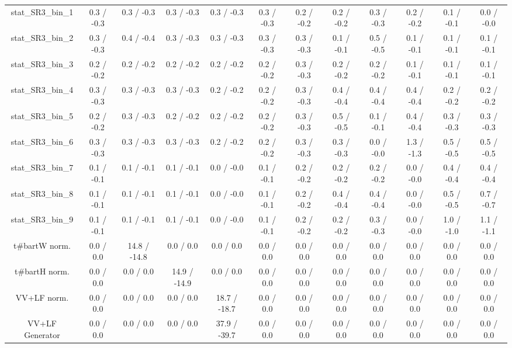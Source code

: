 \begin{table}[htbp]
\begin{center}
\begin{tabular}{|c|c|c|c|c|c|c|c|c|c|c|c|}
 stat_SR3_bin_1 & 0.3 / -0.3 & 0.3 / -0.3 & 0.3 / -0.3 & 0.3 / -0.3 & 0.3 / -0.3 & 0.2 / -0.2 & 0.2 / -0.2 & 0.3 / -0.3 & 0.2 / -0.2 & 0.1 / -0.1 & 0.0 / -0.0 \\ 
 stat_SR3_bin_2 & 0.3 / -0.3 & 0.4 / -0.4 & 0.3 / -0.3 & 0.3 / -0.3 & 0.3 / -0.3 & 0.3 / -0.3 & 0.1 / -0.1 & 0.5 / -0.5 & 0.1 / -0.1 & 0.1 / -0.1 & 0.1 / -0.1 \\ 
 stat_SR3_bin_3 & 0.2 / -0.2 & 0.2 / -0.2 & 0.2 / -0.2 & 0.2 / -0.2 & 0.2 / -0.2 & 0.3 / -0.3 & 0.2 / -0.2 & 0.2 / -0.2 & 0.1 / -0.1 & 0.1 / -0.1 & 0.1 / -0.1 \\ 
 stat_SR3_bin_4 & 0.3 / -0.3 & 0.3 / -0.3 & 0.3 / -0.3 & 0.2 / -0.2 & 0.2 / -0.2 & 0.3 / -0.3 & 0.4 / -0.4 & 0.4 / -0.4 & 0.4 / -0.4 & 0.2 / -0.2 & 0.2 / -0.2 \\ 
 stat_SR3_bin_5 & 0.2 / -0.2 & 0.3 / -0.3 & 0.2 / -0.2 & 0.2 / -0.2 & 0.2 / -0.2 & 0.3 / -0.3 & 0.5 / -0.5 & 0.1 / -0.1 & 0.4 / -0.4 & 0.3 / -0.3 & 0.3 / -0.3 \\ 
 stat_SR3_bin_6 & 0.3 / -0.3 & 0.3 / -0.3 & 0.3 / -0.3 & 0.2 / -0.2 & 0.2 / -0.2 & 0.3 / -0.3 & 0.3 / -0.3 & 0.0 / -0.0 & 1.3 / -1.3 & 0.5 / -0.5 & 0.5 / -0.5 \\ 
 stat_SR3_bin_7 & 0.1 / -0.1 & 0.1 / -0.1 & 0.1 / -0.1 & 0.0 / -0.0 & 0.1 / -0.1 & 0.2 / -0.2 & 0.2 / -0.2 & 0.2 / -0.2 & 0.0 / -0.0 & 0.4 / -0.4 & 0.4 / -0.4 \\ 
 stat_SR3_bin_8 & 0.1 / -0.1 & 0.1 / -0.1 & 0.1 / -0.1 & 0.0 / -0.0 & 0.1 / -0.1 & 0.2 / -0.2 & 0.4 / -0.4 & 0.4 / -0.4 & 0.0 / -0.0 & 0.5 / -0.5 & 0.7 / -0.7 \\ 
 stat_SR3_bin_9 & 0.1 / -0.1 & 0.1 / -0.1 & 0.1 / -0.1 & 0.0 / -0.0 & 0.1 / -0.1 & 0.2 / -0.2 & 0.2 / -0.2 & 0.3 / -0.3 & 0.0 / -0.0 & 1.0 / -1.0 & 1.1 / -1.1 \\ 
  t#bar{t}W norm. & 0.0 / 0.0 & 14.8 / -14.8 & 0.0 / 0.0 & 0.0 / 0.0 & 0.0 / 0.0 & 0.0 / 0.0 & 0.0 / 0.0 & 0.0 / 0.0 & 0.0 / 0.0 & 0.0 / 0.0 & 0.0 / 0.0 \\ 
  t#bar{t}H norm. & 0.0 / 0.0 & 0.0 / 0.0 & 14.9 / -14.9 & 0.0 / 0.0 & 0.0 / 0.0 & 0.0 / 0.0 & 0.0 / 0.0 & 0.0 / 0.0 & 0.0 / 0.0 & 0.0 / 0.0 & 0.0 / 0.0 \\ 
  VV+LF norm. & 0.0 / 0.0 & 0.0 / 0.0 & 0.0 / 0.0 & 18.7 / -18.7 & 0.0 / 0.0 & 0.0 / 0.0 & 0.0 / 0.0 & 0.0 / 0.0 & 0.0 / 0.0 & 0.0 / 0.0 & 0.0 / 0.0 \\ 
  VV+LF Generator & 0.0 / 0.0 & 0.0 / 0.0 & 0.0 / 0.0 & 37.9 / -39.7 & 0.0 / 0.0 & 0.0 / 0.0 & 0.0 / 0.0 & 0.0 / 0.0 & 0.0 / 0.0 & 0.0 / 0.0 & 0.0 / 0.0 \\ 

\end{tabular}
\end{center}
\end{table}
